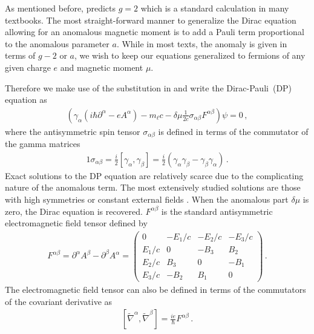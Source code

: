 As mentioned before,  predicts $g\!=\!2$ which is a standard calculation in many textbooks. The most straight-forward manner to generalize the Dirac equation allowing for an anomalous magnetic moment is to add a Pauli term proportional to the anomalous parameter $a$. While in most texts, the anomaly is given in terms of $g-2$ or $a$, we wish to keep our equations generalized to fermions of any given charge $e$ and magnetic moment $\mu$. 

Therefore we make use of the substitution in  and write the Dirac-Pauli~(DP) equation as
\begin{gather}
	\label{dp:1}
    \left(\gamma_{\alpha}\left(i\hbar\partial^{\alpha} - eA^{\alpha}\right) - m_{\ell}c - \delta\mu\frac{1}{2c}\sigma_{\alpha\beta}F^{\alpha\beta}\right)\psi=0\,,
\end{gather}
where the antisymmetric spin tensor $\sigma_{\alpha\beta}$ is defined in terms of the commutator of the gamma matrices
\begin{alignat}{1}
	\label{sigma:1}
    \sigma_{\alpha\beta}=\frac{i}{2}\left[\gamma_{\alpha},\gamma_{\beta}\right]=\frac{i}{2}\left(\gamma_{\alpha}\gamma_{\beta}-\gamma_{\beta}\gamma_{\alpha}\right)\,.
\end{alignat}
Exact solutions to the DP equation are relatively scarce due to the complicating nature of the anomalous term. The most extensively studied solutions are those with high symmetries or constant external fields \citep{Thaller:1992ji}. When the anomalous part $\delta\mu$ is zero, the Dirac equation is recovered. $F^{\alpha\beta}$ is the standard antisymmetric electromagnetic field tensor defined by
\begin{gather}
    \label{em:1}
    F^{\alpha\beta} = \partial^{\alpha}A^{\beta} - \partial^{\beta}A^{\alpha} = 
    \begin{pmatrix}
        0        & -E_{1}/c  & -E_{2}/c  & -E_{3}/c\\
        E_{1}/c  & 0         & -B_{3}    & B_{2}\\
        E_{2}/c  & B_{3}     & 0         & -B_{1}\\
        E_{3}/c  & -B_{2}    & B_{1}     & 0
    \end{pmatrix}\,.
\end{gather}
The electromagnetic field tensor can also be defined in terms of the commutators of the covariant derivative  as
\begin{align}
    \label{curve:1}
    \left[\widetilde\nabla^{\alpha},\widetilde\nabla^{\beta}\right]=
    \frac{ie}{\hbar}F^{\alpha\beta}\,.
\end{align}
